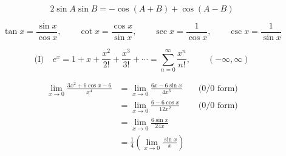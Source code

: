 \begin{equation}
  2\sin A\sin B=-\cos(A+B)+\cos(A-B) \tag{11}
\end{equation}

\begin{equation}
  \tan x=\frac{\sin x}{\cos x},\qquad \cot x=\frac{\cos x}{\sin x},\qquad
  \sec x=\frac{1}{\cos x},\qquad \csc x=\frac{1}{\sin x} \tag{13}
\end{equation}

\[
  \text{(I)}\quad e^{x}=1+x+\frac{x^{2}}{2!}+\frac{x^{3}}{3!}+\cdots
  =\sum_{n=0}^{\infty}\frac{x^{n}}{n!},\qquad(-\infty,\infty)
\]

\begin{align*}
  \lim_{x\to 0}\frac{3x^{2}+6\cos x-6}{x^{4}}
    &=\lim_{x\to 0}\frac{6x-6\sin x}{4x^{3}} &&\text{(0/0 form)}\\
    &=\lim_{x\to 0}\frac{6-6\cos x}{12x^{2}} &&\text{(0/0 form)}\\
    &=\lim_{x\to 0}\frac{6\sin x}{24x}\\
    &=\frac{1}{4}\left(\lim_{x\to 0}\frac{\sin x}{x}\right)
\end{align*}
